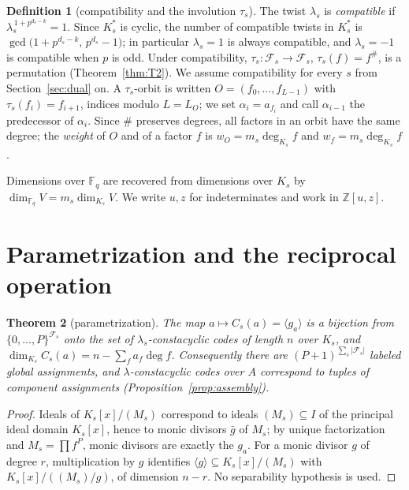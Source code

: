 \documentclass[11pt]{article}
\newtheorem{theorem}{Theorem}[section]
\theoremstyle{definition}
\newtheorem{definition}[theorem]{Definition}
\theoremstyle{remark}
\newcommand{\Fq}{\mathbb{F}_q}
\newcommand{\Z}{\mathbb{Z}}
\begin{document}
\begin{definition}[compatibility and the involution \(\tau_s\)]
The twist \(\lambda_s\) is \emph{compatible} if
\(\lambda_s^{\,1 + p^{d_s - k}} = 1\). Since \(K_s^*\) is cyclic, the
number of compatible twists in \(K_s^*\) is
\(\gcd\big(1 + p^{d_s-k},\, p^{d_s} - 1\big)\); in particular
\(\lambda_s = 1\) is always compatible, and \(\lambda_s = -1\) is
compatible when \(p\) is odd.
Under compatibility, \(\tau_s : \mathcal{F}_s \to \mathcal{F}_s\),
\(\tau_s(f) = f^{\#}\), is a permutation (Theorem~\ref{thm:T2}). We
assume compatibility for every \(s\) from Section~\ref{sec:dual} on.
A \(\tau_s\)-orbit is written \(O = (f_0, \dots, f_{L-1})\) with
\(\tau_s(f_i) = f_{i+1}\), indices modulo \(L = L_O\); we set
\(\alpha_i = a_{f_i}\) and call \(\alpha_{i-1}\) the predecessor of
\(\alpha_i\). Since \(\#\) preserves degrees, all factors in an orbit
have the same degree; the \emph{weight} of \(O\) and of a factor \(f\) is
\(w_O = m_s \deg_{K_s} f\) and \(w_f = m_s \deg_{K_s} f\).
\end{definition}

Dimensions over \(\Fq\) are recovered from dimensions over \(K_s\) by
\(\dim_{\Fq} V = m_s \dim_{K_s} V\). We write \(u, z\) for indeterminates
and work in \(\Z[u,z]\).

\section{Parametrization and the reciprocal operation}\label{sec:param}

\begin{theorem}[parametrization]\label{thm:T1}
The map \(a \mapsto C_s(a) = \langle g_a \rangle\) is a bijection from
\(\{0,\dots,P\}^{\mathcal{F}_s}\) onto the set of \(\lambda_s\)-constacyclic
codes of length \(n\) over \(K_s\), and
\(\dim_{K_s} C_s(a) = n - \sum_{f} a_f \deg f\).
Consequently there are \((P+1)^{\sum_s |\mathcal{F}_s|}\) labeled global
assignments, and \(\lambda\)-constacyclic codes over \(A\) correspond to tuples
of component assignments (Proposition~\ref{prop:assembly}).
\end{theorem}

\begin{proof}
Ideals of \(K_s[x]/(M_s)\) correspond to ideals \((M_s) \subseteq I\) of
the principal ideal domain \(K_s[x]\), hence to monic divisors
\(\bar g\) of \(M_s\); by unique factorization and \(M_s =
\prod f^P\), monic divisors are exactly the \(g_a\). For a monic divisor
\(g\) of degree \(r\), multiplication by \(g\) identifies
\(\langle g \rangle \subseteq K_s[x]/(M_s)\) with
\(K_s[x]/((M_s)/g)\), of dimension \(n - r\). No separability hypothesis
is used.
\end{proof}
\end{document}
